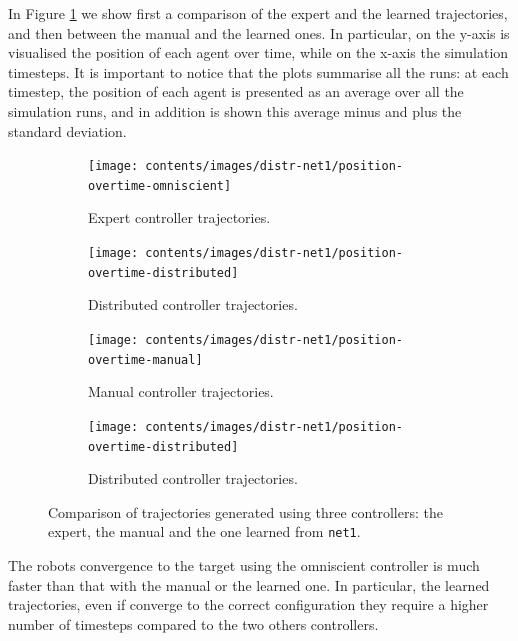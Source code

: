 In Figure \ref{fig:net1traj} we show first a comparison of the expert and the 
learned trajectories, and then between the manual and the learned ones. In 
particular, on the y-axis is visualised the position of each agent over time, while 
on the x-axis the simulation timesteps. It is important to notice that the plots 
summarise all the runs: at each timestep, the position of each agent is presented 
as an average over all the simulation runs, and in addition is  shown this average 
minus and plus the standard deviation.
\begin{figure}[!htb]
	\centering
	\begin{subfigure}[h]{0.49\textwidth}
		\centering
		\texttt{[image: contents/images/distr-net1/position-overtime-omniscient]}%
		\caption{Expert controller trajectories.}
	\end{subfigure}
	\hfill
	\begin{subfigure}[h]{0.49\textwidth}
		\centering
		\texttt{[image: contents/images/distr-net1/position-overtime-distributed]}
		\caption{Distributed controller trajectories.}
	\end{subfigure}
	\hspace*{\fill}%
	
	\vspace*{8pt}%
	
	\hspace*{\fill}%
	\begin{subfigure}[h]{0.49\textwidth}
		\centering
		\texttt{[image: contents/images/distr-net1/position-overtime-manual]}%
		\caption{Manual controller trajectories.}
	\end{subfigure}
	\hfill
	\begin{subfigure}[h]{0.49\textwidth}
		\centering
		\texttt{[image: contents/images/distr-net1/position-overtime-distributed]}
		\caption{Distributed controller trajectories.}
	\end{subfigure}
	\caption[Evaluation of the trajectories learned by \texttt{net1}.]{Comparison 
		of trajectories generated using three controllers: the expert, the manual and 
		the one learned from \texttt{net1}.}
	\label{fig:net1traj}
\end{figure}

The robots convergence to the target using the omniscient controller is much 
faster than that with the manual or the learned one.
In particular, the learned trajectories, even if converge to the correct 
configuration they require a higher number of timesteps compared to the two 
others controllers. 

